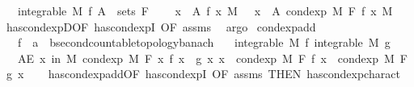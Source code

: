 \begin{isabellebody}
\ \ \ {\isachardoublequoteopen}integrable\ M\ f{\isachardoublequoteclose}\ {\isachardoublequoteopen}A\ {\isasymin}\ sets\ F{\isachardoublequoteclose}\isanewline
\ \ \ {\isachardoublequoteopen}{\isacharparenleft}{\kern0pt}{\isasymintegral}\ x\ {\isasymin}\ A{\isachardot}{\kern0pt}\ f\ x\ {\isasympartial}M{\isacharparenright}{\kern0pt}\ {\isacharequal}{\kern0pt}\ {\isacharparenleft}{\kern0pt}{\isasymintegral}\ x\ {\isasymin}\ A{\isachardot}{\kern0pt}\ cond{\isacharunderscore}{\kern0pt}exp\ M\ F\ f\ x\ {\isasympartial}M{\isacharparenright}{\kern0pt}{\isachardoublequoteclose}\isanewline
%
\isadelimproof
\ \ %
\endisadelimproof
%
\isatagproof
{}\isamarkupfalse%
\ has{\isacharunderscore}{\kern0pt}cond{\isacharunderscore}{\kern0pt}expD{\isacharparenleft}{\kern0pt}{}{\isacharparenright}{\kern0pt}{\isacharbrackleft}{\kern0pt}OF\ has{\isacharunderscore}{\kern0pt}cond{\isacharunderscore}{\kern0pt}expI{\isacharcomma}{\kern0pt}\ OF\ assms{\isacharbrackright}{\kern0pt}\ \isamarkupfalse%
\ argo%
\endisatagproof
{\isafoldproof}%
%
\isadelimproof
\isanewline
%
\endisadelimproof
\isanewline
{}\isamarkupfalse%
\ cond{\isacharunderscore}{\kern0pt}exp{\isacharunderscore}{\kern0pt}add{\isacharcolon}{\kern0pt}\isanewline
\ \ \ f\ {\isacharcolon}{\kern0pt}{\isacharcolon}{\kern0pt}\ {\isachardoublequoteopen}{\isacharprime}{\kern0pt}a\ {\isasymRightarrow}\ {\isacharprime}{\kern0pt}b{\isacharcolon}{\kern0pt}{\isacharcolon}{\kern0pt}{\isacharbraceleft}{\kern0pt}second{\isacharunderscore}{\kern0pt}countable{\isacharunderscore}{\kern0pt}topology{\isacharcomma}{\kern0pt}banach{\isacharbraceright}{\kern0pt}{\isachardoublequoteclose}\isanewline
\ \ \ {\isachardoublequoteopen}integrable\ M\ f{\isachardoublequoteclose}\ {\isachardoublequoteopen}integrable\ M\ g{\isachardoublequoteclose}\isanewline
\ \ \ {\isachardoublequoteopen}AE\ x\ in\ M{\isachardot}{\kern0pt}\ cond{\isacharunderscore}{\kern0pt}exp\ M\ F\ {\isacharparenleft}{\kern0pt}{\isasymlambda}x{\isachardot}{\kern0pt}\ f\ x\ {\isacharplus}{\kern0pt}\ g\ x{\isacharparenright}{\kern0pt}\ x\ {\isacharequal}{\kern0pt}\ cond{\isacharunderscore}{\kern0pt}exp\ M\ F\ f\ x\ {\isacharplus}{\kern0pt}\ cond{\isacharunderscore}{\kern0pt}exp\ M\ F\ g\ x{\isachardoublequoteclose}\isanewline
%
\isadelimproof
\ \ %
\endisadelimproof
%
\isatagproof
{}\isamarkupfalse%
\ has{\isacharunderscore}{\kern0pt}cond{\isacharunderscore}{\kern0pt}exp{\isacharunderscore}{\kern0pt}add{\isacharbrackleft}{\kern0pt}OF\ has{\isacharunderscore}{\kern0pt}cond{\isacharunderscore}{\kern0pt}expI{\isacharparenleft}{\kern0pt}{}{\isacharcomma}{\kern0pt}{}{\isacharparenright}{\kern0pt}{\isacharcomma}{\kern0pt}\ OF\ assms{\isacharcomma}{\kern0pt}\ THEN\ has{\isacharunderscore}{\kern0pt}cond{\isacharunderscore}{\kern0pt}exp{\isacharunderscore}{\kern0pt}charact{\isacharparenleft}{\kern0pt}{}{\isacharparenright}{\kern0pt}{\isacharbrackright}{\kern0pt}\ \isacommand{{\isachardot}{\kern0pt}}\isamarkupfalse%

\end{isabellebody}
